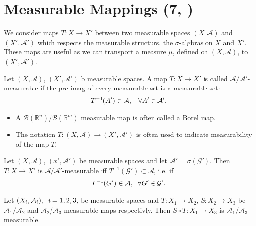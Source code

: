 \section{Measurable Mappings \tiny{ (7, \cite{schilling2017measures})}}

    We consider maps $T:X\rightarrow X'$ between two measurable spaces $(X,\mathcal A)$ and $(X',\mathcal A')$ which respects the measurable 
    structurs, the $\sigma$-algbras on $X$ and $X'$. These maps are useful as we can transport a measure $\mu$, defined on $(X,\mathcal A)$, to $(X',\mathcal A')$.

    

    \begin{definition}
        Let $(X,\mathcal A)$, $(X',\mathcal A')$ b measurable spaces. A map $T:X\rightarrow X'$ is called $\mathcal A/\mathcal A'$-measurable if the pre-imag of every measurable set is a measurable set: 
        \begin{align*}
        T^{-1}(A')\in \mathcal A,\hspace{3mm} \forall A'\in\mathcal A'.    
        \end{align*}

    \end{definition}
    \begin{itemize}
        \item A $\mathcal B(\mathbb R^n)/\mathcal B(\mathbb R^m)$ measurable map is often called a Borel map. 
        \item The notation $T:(X,\mathcal A)\rightarrow (X',\mathcal A')$ is often used to indicate measurability of the map $T$.
    \end{itemize}

    \begin{lemma}
        Let $(X,\mathcal A)$, $(x',\mathcal A')$ be measurable spaces and let $\mathcal A' = \sigma(\mathcal G')$. Then $T:X\rightarrow X'$ is $\mathcal A/\mathcal A'$-measurable iff $T^{-1}(\mathcal G')\subset \mathcal A$, i.e. if 
        \begin{align*}
            T^{-1}(G')\in\mathcal A,\hspace{2mm} \forall G'\in\mathcal G'.
        \end{align*} 
    \end{lemma}


	\begin{theorem}

        Let $(X_i,\mathcal A_i),\hspace{2mm}i=1,2,3$, be measurable spaces and $T:X_1\rightarrow X_2$, $S:X_2\rightarrow X_3$ be $\mathcal A_1/\mathcal A_2$ and $\mathcal A_2/\mathcal A_3$-measurable maps respectivly. Then $S\circ T:X_1\rightarrow X_3$ is $\mathcal A_1/\mathcal A_3$-measurable. 

	\end{theorem}

